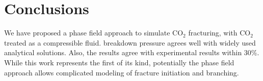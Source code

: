 \section{Conclusions}\label{sec:concl}
We have proposed  a phase field approach to simulate CO$_2$ fracturing, with CO$_2$ treated as a compressible fluid.  breakdown pressure agrees well with widely used analytical solutions. Also, the results agree with experimental results within 30\%. While this work represents the first of its kind, potentially the phase field approach allows complicated modeling of fracture initiation and branching.